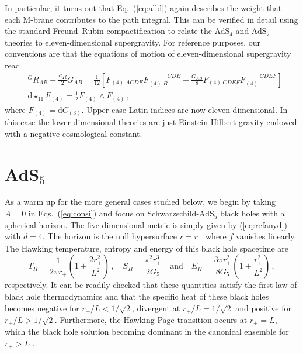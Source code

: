 \documentclass[11pt]{article}
\begin{document}
In particular, it turns out that Eq.~(\ref{eq:alld}) again describes the weight that each M-brane contributes to the path integral.  
This can be verified in detail using the standard Freund–Rubin compactification \cite{Freund:1980xh} to relate the AdS$_4$ and AdS$_7$ theories to eleven-dimensional supergravity.  
For reference purposes, our conventions are that the equations of motion of eleven-dimensional supergravity read
\begin{subequations}
\begin{align}
& {}^{G}R_{AB}-\frac{{}^G R}{2}G_{AB}=\frac{1}{12}\left[F_{(4)\;ACDE}F_{(4)\;B}^{\phantom{(4)\;B}CDE}-\frac{G_{AB}}{8}F_{(4)\;CDEF}F_{(4)}^{\phantom{(4)\;}CDEF}\right]
\\
& \mathrm{d}\star_{11} F_{(4)}=\frac{1}{2}F_{(4)}\wedge F_{(4)}\,,
\end{align}
\end{subequations}%
where $F_{(4)}=\mathrm{d}C_{(3)}$. Upper case Latin indices are now eleven-dimensional. 
In this case the lower dimensional theories are just Einstein-Hilbert gravity endowed with a negative cosmological constant.
\section{AdS$_5$}
\label{sec:ads5}
As a warm up for the more general cases studied below, we begin by taking $A=0$ in Eqs.~(\ref{eq:consi}) and focus on Schwarzschild-AdS$_5$ black holes with a spherical horizon. 
The five-dimensional metric is simply given by (\ref{eq:refanyd}) with $d=4$.
The horizon is the null hypersurface $r=r_+$ where $f$ vanishes linearly. The Hawking temperature, entropy and energy of this black hole spacetime are
\begin{equation}
T_H = \frac{1}{2 \pi  r_+}\left(1+\frac{2 r_+^2}{L^2}\right)\,,\quad S_H = \frac{\pi^2r_+^3}{2 G_5}\quad\text{and}\quad E_H = \frac{3\pi r_+^2}{8 G_5}\left(1+\frac{r_+^2}{L^2}\right)\,,
\end{equation}
respectively. 
It can be readily checked that these quantities satisfy the first law of black hole thermodynamics and that the specific heat of these black holes becomes negative for $r_+/L<1/\sqrt{2}$, divergent at $r_+/L=1/\sqrt{2}$ and positive for $r_+/L>1/\sqrt{2}$. 
Furthermore, the Hawking-Page transition occurs at $r_+=L$, which the black hole solution becoming dominant in the canonical ensemble for $r_+>L$ \cite{Hawking:1982dh}.
\end{document}
